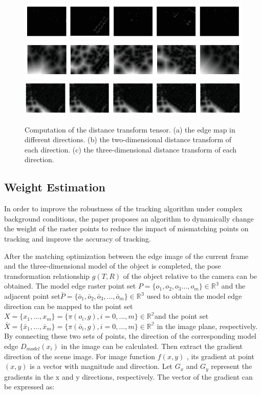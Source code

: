 \documentclass{cta-author}
\begin{document}
  \begin{figure}[!h]
    \centering
    \includegraphics{fig4a.eps}
    \includegraphics{fig4b.eps}
    \includegraphics{fig4c.eps}
    \caption{ Computation of the distance transform tensor. (a)  the edge map in different directions. (b)   the two-dimensional distance transform of each direction. (c) the three-dimensional distance transform of each direction.}
    \label{4a}
  \end{figure}




\subsection{Weight Estimation}\label{sec3.3}

In order to improve the robustness of the tracking algorithm under complex background conditions, the paper proposes an algorithm to dynamically change the weight of the raster points to reduce the impact of mismatching points on tracking and improve the accuracy of tracking.

After the matching optimization between the edge image of the current frame and the three-dimensional model of the object is completed, the pose transformation relationship $g(T,R)$ of the object relative to the camera can be obtained. The model edge raster point set $P={\{o_{1},o_{2},o_{3}...,o_{m}\}}\in \mathbb{R^{3}}$ and the adjacent point set$\bar{P}={\{\bar{o}_{1},\bar{o}_{2},\bar{o}_{3},...,\bar{o}_{m}\}}\in \mathbb{R^{3}}$ used to obtain the model edge direction can be mapped to the point set $X=\{x_1,...,x_m\}=\{\pi(o_i,g),i=0,...,m\}\in \mathbb{R^{2}}$and the point set $\bar{X}=\{\bar{x}_1,...,\bar{x}_m\}=\{\pi(\bar{o}_i,g),i=0,...,m\}\in \mathbb{R^{2}}$ in the image plane, respectively. By connecting these two sets of points, the direction of the corresponding model edge $D_{model}(x_i)$ in the image can be calculated. Then extract the gradient direction of the scene image. For image function $f(x,y)$ , its gradient at point $(x,y)$ is a vector with magnitude and direction. Let $G_x$ and $G_y$  represent the gradients in the x  and  y  directions, respectively. The vector of the gradient can be expressed as:
\end{document}
